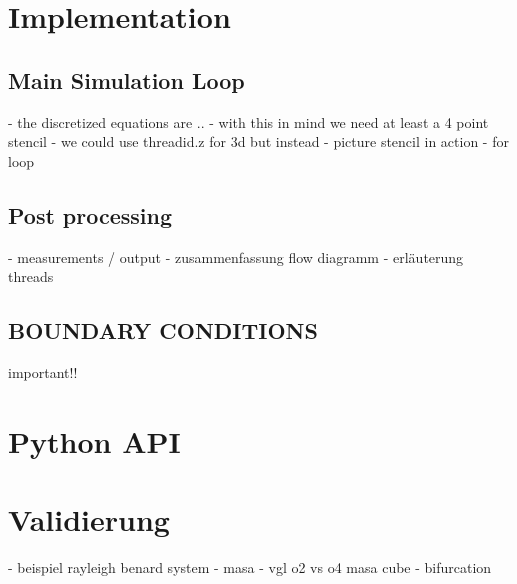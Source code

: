 \section{Implementation}

\subsection{Main Simulation Loop}
- the discretized equations are ..
- with this in mind we need at least a 4 point stencil
- we could use threadid.z for 3d but instead
- picture stencil in action
- for loop

\subsection{Post processing}
- measurements / output
- zusammenfassung flow diagramm
- erläuterung threads


\subsection{BOUNDARY CONDITIONS}
important!!

\section{Python API}

\section{Validierung}
- beispiel rayleigh benard system
- masa
- vgl o2 vs o4 masa cube
- bifurcation

\newpage

